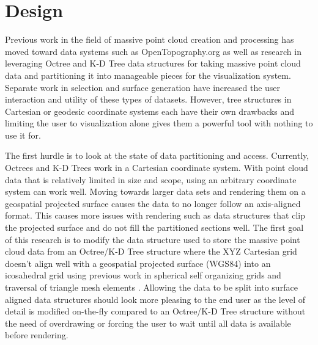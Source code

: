 \chapter{Design}
Previous work in the field of massive point cloud creation and processing has
moved toward data systems
\cite{6_krishnan_crosby_nandigam_phan_cowart_baru_arrowsmith_2011} such as
OpenTopography.org as well as research in leveraging Octree and K-D Tree data
structures for taking massive point cloud data and partitioning it into
manageable pieces for the visualization system.
Separate work in selection and surface generation have increased the user
interaction and utility of these types of datasets. However, tree structures in
Cartesian or geodesic coordinate systems each have their own drawbacks and
limiting the user to visualization alone gives them a powerful tool with nothing
to use it for.

The first hurdle is to look at the state of data partitioning and access.
Currently, Octrees and K-D Trees work in a Cartesian coordinate system. With
point cloud data that is relatively limited in size and scope, using an
arbitrary coordinate system can work well. Moving towards larger data sets and
rendering them on a geospatial projected surface causes the data to no longer
follow an axis-aligned format. This causes more issues with rendering such as
data structures that clip the projected surface and do not fill the partitioned
sections well. The first goal of this research is to modify the data structure
used to store the massive point cloud data from an Octree/K-D Tree structure
where the XYZ Cartesian grid doesn't align well with a geospatial projected
surface (WGS84) into an icosahedral grid using previous work in spherical self
organizing grids \cite{7_wutakatsuka_2006} and traversal of triangle mesh
elements \cite{8_lee1998traversing} \cite{9_white_2000}.
Allowing the data to be split into surface aligned data structures should look
more pleasing to the end user as the level of detail is modified on-the-fly
compared to an Octree/K-D Tree structure without the need of overdrawing or
forcing the user to wait until all data is available before rendering.

